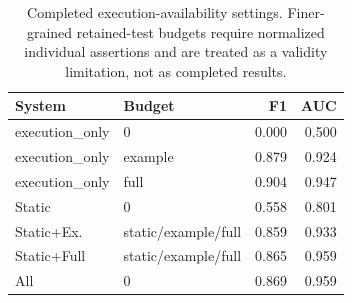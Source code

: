 \begin{table}[!htbp]
\centering
\scriptsize
\begin{tabular}{llrr}
\toprule
System & Budget & F1 & AUC \\
\midrule
execution\_only & 0 & 0.000 & 0.500 \\
execution\_only & example & 0.879 & 0.924 \\
execution\_only & full & 0.904 & 0.947 \\
Static & 0 & 0.558 & 0.801 \\
Static+Ex. & static/example/full & 0.859 & 0.933 \\
Static+Full & static/example/full & 0.865 & 0.959 \\
All & 0 & 0.869 & 0.959 \\
\bottomrule
\end{tabular}
\vspace{0.5em}
\caption{Completed execution-availability settings. Finer-grained retained-test budgets require normalized individual assertions and are treated as a validity limitation, not as completed results.}
\label{tab:execution-budget}
\end{table}
